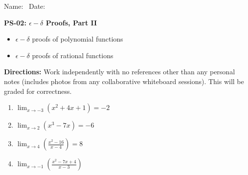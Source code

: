 \documentclass{article}
\begin{document}
\flushleft
Name:\ \makebox[3in]{\hrulefill} \hspace{1in} Date:\ \makebox[1in]{\hrulefill} 
\begin{center}
    \textbf{PS-02: $\epsilon-\delta$ Proofs, Part II}
\end{center}

\begin{center}
\begin{tcolorbox}[colback=white, colframe=black, colbacktitle=white, coltitle=black, title=\textbf{Topics},boxrule=1pt,width=12cm]
    \begin{itemize}
        \item $\epsilon-\delta$ proofs of polynomial functions
        \item $\epsilon-\delta$ proofs of rational functions
    \end{itemize}
\end{tcolorbox}
\end{center}

\textbf{Directions:} Work independently with no references other than any personal notes (includes photos from any collaborative whiteboard sessions). This will be graded for correctness.
\begin{enumerate}
  \item $\lim_{x \to -3} \left(x^2+4x+1\right) = -2$
  \item $\lim_{x \to 2} \left( x^3 - 7x \right) = -6$
  \item $\lim_{x \to 4} \left( \frac{x^2 - 16}{x-4} \right)= 8$
  \item $\lim_{x \to -1} \left( \frac{x^{2}-7x+4}{x-3} \right)$
\end{enumerate}
\end{document}
